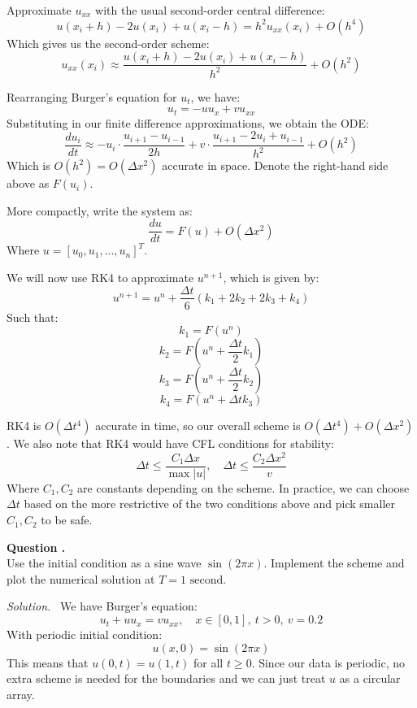 \documentclass[12pt]{article}
\newcounter{question}
\newcounter{subquest}
\newcommand{\subquestion}{
    \stepcounter{subquest} 
    \vspace{.5em}
    \textbf{\large Question \thequestion.\thesubquest}
    \vspace{.25em}\ \\}
\newcommand{\solution}
    {\par\vspace{0.5em}\noindent\emph{Solution.}\ }
    {\par\vspace{1em}}
\begin{document}
Approximate $u_{xx}$ with the usual second-order central difference:
\[u(x_i+h) - 2u(x_i) + u(x_i - h) = h^2u_{xx}(x_i) + O(h^4)\]
Which gives us the second-order scheme:
\[u_{xx}(x_i) \approx \frac{u(x_i+h) - 2u(x_i) + u(x_i - h)}{h^2} + O(h^2)\]

Rearranging Burger's equation for $u_t$, we have:
\[u_t = -uu_x + vu_{xx}\]
Substituting in our finite difference approximations, we obtain the ODE:
\[\frac{d u_i}{dt} \approx -u_i \cdot \frac{u_{i+1}- u_{i-1}}{2h} + v \cdot \frac{u_{i+1} - 2u_i + u_{i-1}}{h^2}+O(h^2)\]
Which is $O(h^2)=O(\Delta x^2)$ accurate in space. Denote the right-hand side above as $F(u_i)$. 

More compactly, write the system as:
\[\frac{d u}{dt} = F(u) + O(\Delta x^2)\]
Where $u = [u_0, u_1, ..., u_n]^T$.

We will now use RK4 to approximate $u^{n+1}$, which is given by:
\[u^{n+1} = u^n + \frac{\Delta t}{6}(k_1 + 2k_2 + 2k_3 + k_4)\]
Such that:
\[k_1 = F(u^n)\]
\[k_2 = F\left(u^n + \frac{\Delta t}{2}k_1\right)\]
\[k_3 = F\left(u^n + \frac{\Delta t}{2}k_2\right)\]
\[k_4 = F\left(u^n + \Delta t k_3\right)\]

RK4 is $O(\Delta t^4)$ accurate in time, so our overall scheme is $O(\Delta t^4)+O(\Delta x^2)$.
We also note that RK4 would have CFL conditions for stability:
\[\Delta t \leq \frac{C_1 \Delta x}{\max |u|}, \quad \Delta t \leq \frac{C_2 \Delta x^2}{v}\] 
Where $C_1, C_2$ are constants depending on the scheme.
In practice, we can choose $\Delta t$ based on the more restrictive of the two conditions above and pick smaller $C_1, C_2$ to be safe.

\subquestion
Use the initial condition as a sine wave $\sin(2\pi x)$. 
Implement the scheme and plot the numerical solution 
at $T=1 \text{ second}$.

\solution
We have Burger's equation:
\[u_t+uu_x=vu_{xx},\quad x\in[0,1], \ t>0, \ v=0.2\]
With periodic initial condition:
\[u(x,0) = \sin(2\pi x)\]
This means that $u(0,t) = u(1,t)$ for all $t \geq 0$. Since our data is periodic, no extra scheme is needed for the boundaries and we can just treat $u$ as a circular array.
\end{document}

